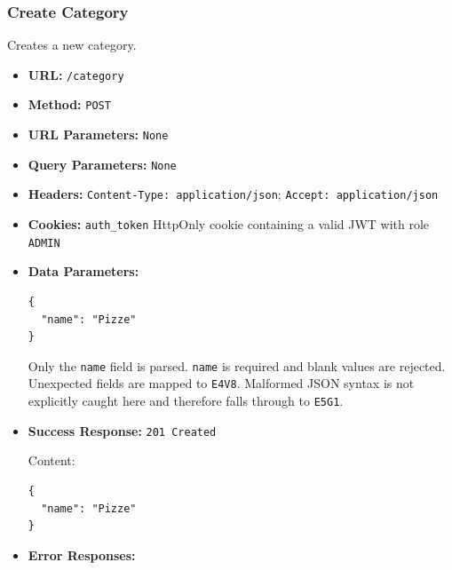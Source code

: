 \subsubsection*{Create Category}

Creates a new category.

\begin{itemize}[nosep]
\item \textbf{URL:} \texttt{/category}

\item \textbf{Method:} \texttt{POST}

\item \textbf{URL Parameters:} \texttt{None}

\item \textbf{Query Parameters:} \texttt{None}

\item \textbf{Headers:} \texttt{Content-Type: application/json}; \texttt{Accept: application/json}

\item \textbf{Cookies:} \texttt{auth\_token} HttpOnly cookie containing a valid JWT with role \texttt{ADMIN}

\item \textbf{Data Parameters:}

\begin{lstlisting}
{
  "name": "Pizze"
}
\end{lstlisting}

Only the \texttt{name} field is parsed. \texttt{name} is required and blank values are rejected. Unexpected fields are mapped to \texttt{E4V8}. Malformed JSON syntax is not explicitly caught here and therefore falls through to \texttt{E5G1}.

\item \textbf{Success Response:} \texttt{201 Created}

Content:

\begin{lstlisting}
{
  "name": "Pizze"
}
\end{lstlisting}

\item \textbf{Error Responses:}


\end{itemize}
